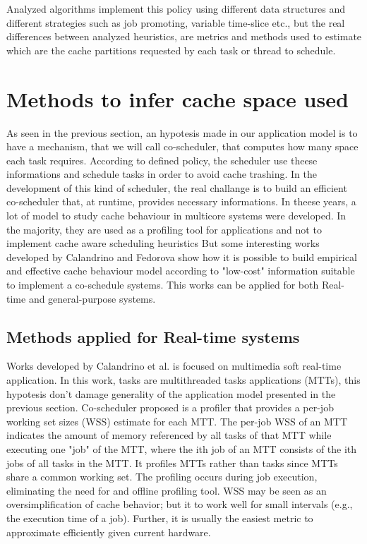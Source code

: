 Analyzed algorithms implement this policy using different data structures and different strategies such as job promoting, variable time-slice etc., but 
the real differences between analyzed heuristics, are metrics and methods used to estimate which are the cache partitions requested by each task or
thread to schedule.

\section{Methods to infer cache space used}

As seen in the previous section, an hypotesis made in our application model is to have a mechanism, that we will call co-scheduler, that computes how many 
space each task requires. According to defined policy, the scheduler use theese informations and schedule tasks in order to avoid cache trashing.
In the development of this kind of scheduler, the real challange is to build an efficient co-scheduler that, at runtime, provides necessary informations.
In theese years, a lot of model to study cache behaviour in multicore systems were developed. In the majority, they are used as a profiling tool for
applications and not to implement cache aware scheduling heuristics %
But some interesting works developed by Calandrino and Fedorova show how it is possible to build empirical and effective cache behaviour model
according to "low-cost" information suitable to implement a co-schedule systems. This works can be applied for both Real-time and general-purpose systems.

\subsection{Methods applied for Real-time systems}

Works developed by Calandrino et al. is focused on multimedia soft real-time application. In this work, tasks are multithreaded tasks applications (MTTs),
this hypotesis don't damage generality of the application model presented in the previous section.
Co-scheduler proposed is a profiler that provides a per-job working set sizes (WSS) estimate for each MTT. The per-job WSS of an MTT indicates the amount 
of memory referenced by all tasks of that MTT while executing one "job" of the MTT, where the ith job of an MTT consists of the ith jobs of all tasks 
in the MTT. It profiles MTTs rather than tasks since MTTs share a common working set. 
The profiling occurs during job execution, eliminating the need for and offline profiling tool. WSS may be seen as an oversimplification of 
cache behavior; but it to work well for small intervals (e.g., the execution time of a job). Further, it is usually the easiest metric to 
approximate efficiently given current hardware.

